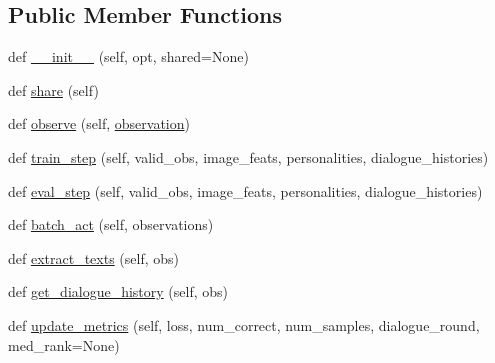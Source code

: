 \subsection*{Public Member Functions}
\begin{DoxyCompactItemize}
\item 
def \hyperlink{classtransresnet__multimodal_1_1transresnet__multimodal_1_1TransresnetMultimodalAgent_aa5ce087d40d18be9ac90e1d25a97f40d}{\+\_\+\+\_\+init\+\_\+\+\_\+} (self, opt, shared=None)
\item 
def \hyperlink{classtransresnet__multimodal_1_1transresnet__multimodal_1_1TransresnetMultimodalAgent_a94742281daa7e237302c849e529d8592}{share} (self)
\item 
def \hyperlink{classtransresnet__multimodal_1_1transresnet__multimodal_1_1TransresnetMultimodalAgent_aca7bfd0e87f63ddd1a716b99efc85774}{observe} (self, \hyperlink{classtransresnet__multimodal_1_1transresnet__multimodal_1_1TransresnetMultimodalAgent_a6e4eda632ec6da99bd2504eeeb049784}{observation})
\item 
def \hyperlink{classtransresnet__multimodal_1_1transresnet__multimodal_1_1TransresnetMultimodalAgent_a7a753d1b9c14dfed7cb4557051f14115}{train\+\_\+step} (self, valid\+\_\+obs, image\+\_\+feats, personalities, dialogue\+\_\+histories)
\item 
def \hyperlink{classtransresnet__multimodal_1_1transresnet__multimodal_1_1TransresnetMultimodalAgent_ac38417de9a1c4f653bffeb852dac0a7d}{eval\+\_\+step} (self, valid\+\_\+obs, image\+\_\+feats, personalities, dialogue\+\_\+histories)
\item 
def \hyperlink{classtransresnet__multimodal_1_1transresnet__multimodal_1_1TransresnetMultimodalAgent_a057eb1109f5c2ea467539083e2f7e7f6}{batch\+\_\+act} (self, observations)
\item 
def \hyperlink{classtransresnet__multimodal_1_1transresnet__multimodal_1_1TransresnetMultimodalAgent_ac1e4bd7463865562a56b8d204127f26e}{extract\+\_\+texts} (self, obs)
\item 
def \hyperlink{classtransresnet__multimodal_1_1transresnet__multimodal_1_1TransresnetMultimodalAgent_a84b3d72c768687151e9a6b5461927034}{get\+\_\+dialogue\+\_\+history} (self, obs)
\item 
def \hyperlink{classtransresnet__multimodal_1_1transresnet__multimodal_1_1TransresnetMultimodalAgent_a2469ded22fbb2c690a814b54f51791d4}{update\+\_\+metrics} (self, loss, num\+\_\+correct, num\+\_\+samples, dialogue\+\_\+round, med\+\_\+rank=None)
\item 

\end{DoxyCompactItemize}
